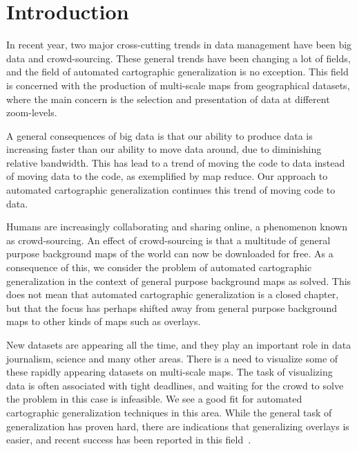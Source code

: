 \section{Introduction}
In recent year, two major cross-cutting trends in data management have been  big data and crowd-sourcing. These general trends have been changing a lot of fields, and the field of automated cartographic generalization is no exception. This field is concerned with the production of multi-scale maps from geographical datasets, where the main concern is the selection and presentation of data at different zoom-levels.

A general consequences of big data is that our ability to produce data is increasing faster than our ability to move data around, due to diminishing relative bandwidth. This has lead to a trend of moving the code to data instead of moving data to the code, as exemplified by map reduce. Our approach to automated cartographic generalization continues this trend of moving code to data.

Humans are increasingly collaborating and sharing online, a phenomenon known as crowd-sourcing. An effect of crowd-sourcing is that a multitude of general purpose background maps of the world can now be downloaded for free. As a consequence of this, we consider the problem of automated cartographic generalization in the context of general purpose background maps as solved. This does not mean that automated cartographic generalization is a closed chapter, but that the focus has perhaps shifted away from general purpose background maps to other kinds of maps such as overlays. 

New datasets are appearing all the time, and they play an important role in data journalism, science and many other areas. There is a need to visualize some of these rapidly appearing datasets on multi-scale maps. The task of visualizing data is often associated with tight deadlines, and waiting for the crowd to solve the problem in this case is infeasible. We see a good fit for automated cartographic generalization techniques in this area. While the general task of generalization has proven hard, there are indications that generalizing overlays is easier, and recent success has been reported in this field~\cite{fusiontables,thatotherpaper}.


